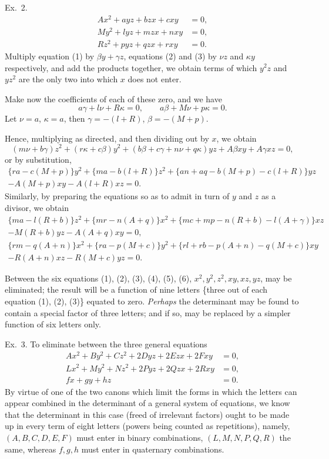 \documentclass[11pt]{article}
\newcommand{\sourcepage}[1]{\marginpar{\scriptsize p.~#1}}
\begin{document}
\medskip
\noindent Ex.~2. 
\begin{align}
 A x^2+ayz+bzx+cxy&=0,\tag{1}\\
 M y^2+lyz+mzx+nxy&=0,\tag{2}\\
 R z^2+pyz+qzx+rxy&=0.\tag{3}
\end{align}
Multiply equation (1) by $\beta y+\gamma z$, equations (2) and (3) by $\nu z$ and $\kappa y$ respectively, and add the products together, we obtain terms of which $y^2z$ and $yz^2$ are the only two into which $x$ does not enter.

Make now the coefficients of each of these zero, and we have
\[
 a\gamma+l\nu+R\kappa=0,
 \qquad
 a\beta+M\nu+p\kappa=0.
\]
Let $\nu=a$, $\kappa=a$, then $\gamma=-(l+R)$, $\beta=-(M+p)$.

Hence, multiplying as directed, and then dividing out by $x$, we obtain
\[
(m\nu+b\gamma)z^2+(r\kappa+c\beta)y^2+(b\beta+c\gamma+n\nu+q\kappa)yz+A\beta xy+A\gamma xz=0,
\]
or by substitution,
\begin{multline}
\{ra-c(M+p)\}y^2+\{ma-b(l+R)\}z^2+
\{an+aq-b(M+p)-c(l+R)\}yz\\
-A(M+p)xy-A(l+R)xz=0.\tag{4}
\end{multline}
Similarly, by preparing the equations so as to admit in turn of $y$ and $z$ as a divisor, we obtain
\begin{multline}
\{ma-l(R+b)\}z^2+\{mr-n(A+q)\}x^2+
\{mc+mp-n(R+b)-l(A+\gamma)\}xz\\
-M(R+b)yz-A(A+q)xy=0,\tag{5}
\end{multline}
\begin{multline}
\{rm-q(A+n)\}x^2+\{ra-p(M+c)\}y^2+
\{rl+rb-p(A+n)-q(M+c)\}xy\\
-R(A+n)xz-R(M+c)yz=0.\tag{6}
\end{multline}

\sourcepage{63}
Between the six equations (1), (2), (3), (4), (5), (6), $x^2,y^2,z^2,xy,xz,yz$, may be eliminated; the result will be a function of nine letters \{three out of each equation (1), (2), (3)\} equated to zero. \emph{Perhaps} the determinant may be found to contain a special factor of three letters; and if so, may be replaced by a simpler function of six letters only.

\medskip
\noindent Ex.~3. \quad To eliminate between the three general equations
\begin{align*}
 Ax^2+By^2+Cz^2+2Dyz+2Ezx+2Fxy&=0,\\
 Lx^2+My^2+Nz^2+2Pyz+2Qzx+2Rxy&=0,\\
 fx+gy+hz&=0.
\end{align*}
By virtue of one of the two canons which limit the forms in which the letters can appear combined in the determinant of a general system of equations, we know that the determinant in this case (freed of irrelevant factors) ought to be made up in every term of eight letters (powers being counted as repetitions), namely, $(A,B,C,D,E,F)$ must enter in binary combinations, $(L,M,N,P,Q,R)$ the same, whereas $f,g,h$ must enter in quaternary combinations.
\end{document}
